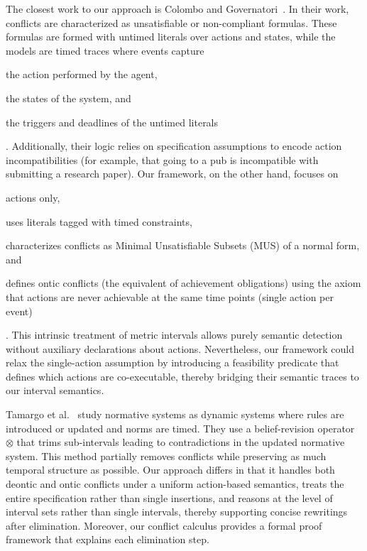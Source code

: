 The closest work to our approach is Colombo and Governatori~\cite{colombo2014detecting}. In their work, conflicts are characterized as unsatisfiable or non-compliant formulas. These formulas are formed with untimed literals over actions and states, while the models are timed traces where events capture \begin{inparaenum}[(i)] \item the action performed by the agent, \item the states of the system, and \item the triggers and deadlines of the untimed literals\end{inparaenum}. Additionally, their logic relies on specification assumptions to encode action incompatibilities (for example, that going to a pub is incompatible with submitting a research paper). Our framework, on the other hand, focuses on \begin{inparaenum}[(i)] \item actions only, \item uses literals tagged with timed constraints, \item characterizes conflicts as Minimal Unsatisfiable Subsets (MUS) of a normal form, and \item defines ontic conflicts (the equivalent of achievement obligations) using the axiom that actions are never achievable at the same time points (single action per event)\end{inparaenum}. This intrinsic treatment of metric intervals allows purely semantic detection without auxiliary declarations about actions. Nevertheless, our framework could relax the single-action assumption by introducing a feasibility predicate that defines which actions are co-executable, thereby bridging their semantic traces to our interval semantics.

Tamargo et al.~\cite{DBLP:journals/flap/TamargoMRG21} study normative systems as dynamic systems where rules are introduced or updated and norms are timed. They use a belief-revision operator $\otimes$ that trims sub-intervals leading to contradictions in the updated normative system. This method partially removes conflicts while preserving as much temporal structure as possible. Our approach differs in that it handles both deontic and ontic conflicts under a uniform action-based semantics, treats the entire specification rather than single insertions, and reasons at the level of interval sets rather than single intervals, thereby supporting concise rewritings after elimination. Moreover, our conflict calculus provides a formal proof framework that explains each elimination step.

